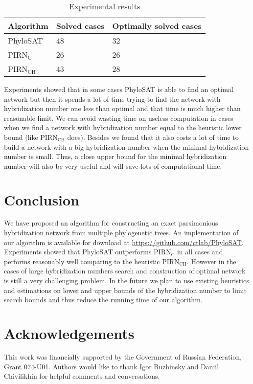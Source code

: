 \documentclass[runningheads, envcountsame, a4paper]{llncs}
\begin{document}
\begin{table}[t]
\centering
\caption{Experimental results}
\begin{tabular}{l | l | l}
  Algorithm & Solved cases & Optimally solved cases \\
  
  \hline
  PhyloSAT & 48 & 32 \\
  PIRN$\mathrm{_C}$ & 26 & 26 \\
  PIRN$\mathrm{_{CH}}$ & 43 & 28 \\
  
\end{tabular}
\label{exp-results-table}
\end{table}

Experiments showed that in some cases PhyloSAT is able to find an optimal network but then it spends a lot of time trying to find the network 
with hybridization number one less than optimal and that time is much higher than reasonable limit. We can avoid wasting time on useless computation 
in cases when we find a network with hybridization number equal to the heuristic lower bound (like PIRN$\mathrm{_{CH}}$ does). Besides we found 
that it also costs a lot of time to build a network with a big hybridization number when the minimal hybridization number is small. 
Thus, a close upper bound for the minimal hybridization number will also be very useful and will save lots of computational time.

\section{Conclusion}

We have proposed an algorithm for constructing an exact parsimonious hybridization network from multiple phylogenetic trees.
An implementation of our algorithm is available for download at \url{https://github.com/ctlab/PhyloSAT}.
Experiments showed that PhyloSAT outperforms PIRN$\mathrm{_C}$ in all cases and performs reasonably well comparing 
to the heuristic PIRN$\mathrm{_{CH}}$. 
However in the cases of large hybridization numbers search and construction of optimal network is still a very challenging problem. 
In the future we plan to use existing heuristics and estimations on lower and upper bounds of the hybridization number to 
limit search bounds and thus reduce the running time of our algorithm.

\section*{Acknowledgements}

This work was financially supported by the Government of Russian Federation, Grant 074-U01. Authors would like to thank Igor Buzhinsky and Daniil Chivilikhin for helpful comments and conversations.



\clearpage
\end{document}
